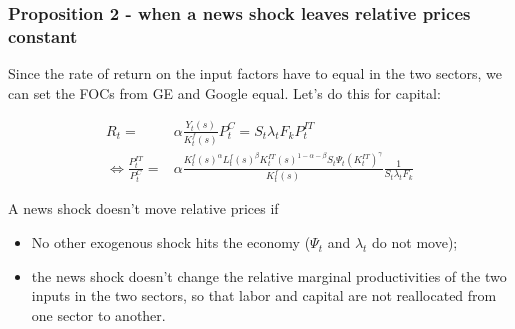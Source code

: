 \documentclass{beamer}
\begin{document}
\begin{frame}
\frametitle{Proposition 2 - when a news shock leaves relative prices constant}

Since the rate of return on the input factors have to equal in the two sectors, we can set the FOCs from GE and Google equal. Let's do this for capital:

\begin{align*}
R_t = & \alpha \frac{Y_t(s)}{K^f_t(s)} P^C_t = S_t \lambda_t F_k P^{IT}_t \\
\Leftrightarrow \frac{P^{IT}_t }{P^{C}_t } = & \alpha \frac{K^f_t(s)^{\alpha}L^f_t(s)^{\beta}K^{IT}_t(s)^{1-\alpha - \beta}S_t \Psi_t (K^{IT}_t)^{\gamma} }{K^f_t(s)} \frac{1}{S_t \lambda_t F_k}
\end{align*}


A news shock doesn't move relative prices if 
\begin{itemize}
\item No other exogenous shock hits the economy ($\Psi_t$ and $\lambda_t$ do not move);
\item the news shock doesn't change the relative marginal productivities of the two inputs in the two sectors, so that labor and capital are not reallocated from one sector to another.
\end{itemize}




\end{frame}
\end{document}
